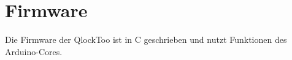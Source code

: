 
\section{Firmware}
\label{sec:Firmware}

Die Firmware der QlockToo ist in C geschrieben und nutzt Funktionen des Arduino-Cores.
